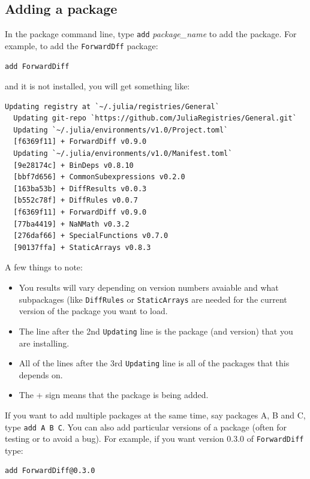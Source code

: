 \hypertarget{adding-a-package}{%
\subsection{Adding a package}\label{adding-a-package}}

In the package command line, type \texttt{add} \emph{package\_name} to
add the package. For example, to add the \texttt{ForwardDff} package:

\begin{verbatim}
add ForwardDiff
\end{verbatim}

and it is not installed, you will get something like:

\begin{verbatim}
Updating registry at `~/.julia/registries/General`
  Updating git-repo `https://github.com/JuliaRegistries/General.git`
  Updating `~/.julia/environments/v1.0/Project.toml`
  [f6369f11] + ForwardDiff v0.9.0
  Updating `~/.julia/environments/v1.0/Manifest.toml`
  [9e28174c] + BinDeps v0.8.10
  [bbf7d656] + CommonSubexpressions v0.2.0
  [163ba53b] + DiffResults v0.0.3
  [b552c78f] + DiffRules v0.0.7
  [f6369f11] + ForwardDiff v0.9.0
  [77ba4419] + NaNMath v0.3.2
  [276daf66] + SpecialFunctions v0.7.0
  [90137ffa] + StaticArrays v0.8.3
\end{verbatim}

A few things to note:

\begin{itemize}
\item You results will vary depending on version numbers avaiable and what subpackages (like \verb!DiffRules! or \verb!StaticArrays! are needed for the current version of the package you want to load. 
\item  The line after the 2nd \texttt{Updating} line is the package (and version) that you are installing.
\item  All of the lines after the 3rd \texttt{Updating} line is all of the  packages that this depends on.
\item  The + sign means that the package is being added.
\end{itemize}

If you want to add multiple packages at the same time, say packages A, B
and C, type \texttt{add\ A\ B\ C}. You can also add particular versions
of a package (often for testing or to avoid a bug). For example, if you
want version 0.3.0 of \texttt{ForwardDiff} type:

\begin{verbatim}
add ForwardDiff@0.3.0
\end{verbatim}

